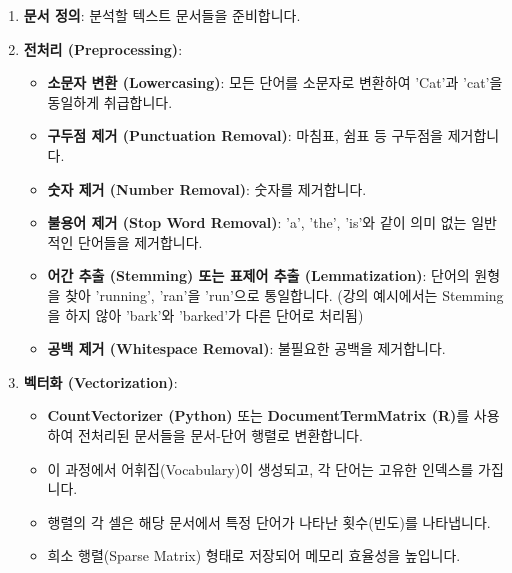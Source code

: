 \documentclass[11pt,a4paper]{article}
\theoremstyle{definition}
\begin{document}
\begin{enumerate}
    \item \textbf{문서 정의}: 분석할 텍스트 문서들을 준비합니다.
    \item \textbf{전처리 (Preprocessing)}:
    \begin{itemize}
        \item \textbf{소문자 변환 (Lowercasing)}: 모든 단어를 소문자로 변환하여 'Cat'과 'cat'을 동일하게 취급합니다.
        \item \textbf{구두점 제거 (Punctuation Removal)}: 마침표, 쉼표 등 구두점을 제거합니다.
        \item \textbf{숫자 제거 (Number Removal)}: 숫자를 제거합니다.
        \item \textbf{불용어 제거 (Stop Word Removal)}: 'a', 'the', 'is'와 같이 의미 없는 일반적인 단어들을 제거합니다.
        \item \textbf{어간 추출 (Stemming) 또는 표제어 추출 (Lemmatization)}: 단어의 원형을 찾아 'running', 'ran'을 'run'으로 통일합니다. (강의 예시에서는 Stemming을 하지 않아 'bark'와 'barked'가 다른 단어로 처리됨)
        \item \textbf{공백 제거 (Whitespace Removal)}: 불필요한 공백을 제거합니다.
    \end{itemize}
    \item \textbf{벡터화 (Vectorization)}:
    \begin{itemize}
        \item \textbf{CountVectorizer (Python)} 또는 \textbf{DocumentTermMatrix (R)}를 사용하여 전처리된 문서들을 문서-단어 행렬로 변환합니다.
        \item 이 과정에서 어휘집(Vocabulary)이 생성되고, 각 단어는 고유한 인덱스를 가집니다.
        \item 행렬의 각 셀은 해당 문서에서 특정 단어가 나타난 횟수(빈도)를 나타냅니다.
        \item 희소 행렬(Sparse Matrix) 형태로 저장되어 메모리 효율성을 높입니다.
    \end{itemize}
\end{enumerate}
\end{document}
